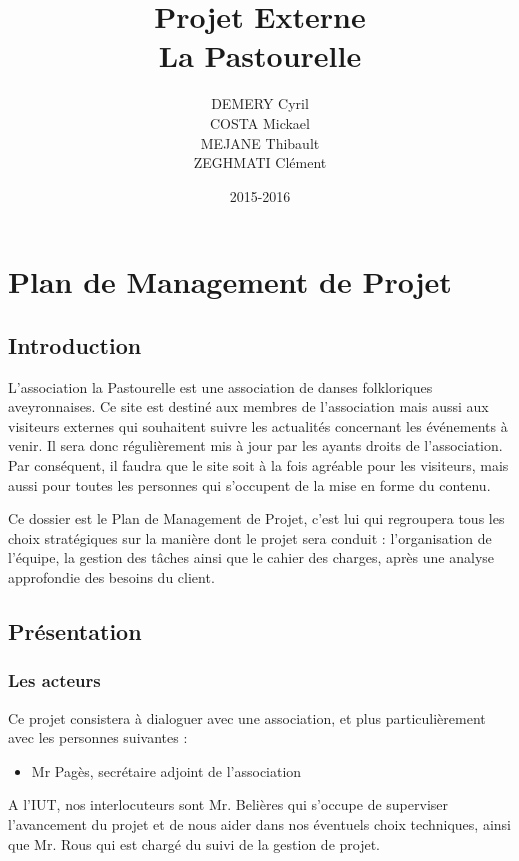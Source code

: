 \documentclass[11pt]{report}
\title{Projet Externe\\La Pastourelle}
\author{DEMERY Cyril\\COSTA Mickael\\MEJANE Thibault\\ZEGHMATI Clément}
\date{2015-2016}
\begin{document}
\maketitle
\setcounter{tocdepth}{5}
\tableofcontents
\chapter{Plan de Management de Projet}
\section{Introduction}
L’association la Pastourelle est une association de danses folkloriques 
aveyronnaises. Ce site est destiné aux membres de l’association mais aussi aux 
visiteurs externes qui souhaitent suivre les actualités concernant les 
événements à venir. Il sera donc régulièrement mis à jour par les ayants 
droits de l’association. Par conséquent, il faudra que le site soit à la fois 
agréable pour les visiteurs, mais aussi pour toutes les personnes qui 
s'occupent de la mise en forme du contenu.\\

\par Ce dossier est le Plan de Management de Projet, c'est lui qui regroupera 
tous les choix stratégiques sur la manière dont le projet sera conduit : 
l'organisation de l'équipe, la gestion des tâches ainsi que le cahier des 
charges, après une analyse approfondie des besoins du client.

\section{Présentation}
\subsection{Les acteurs}
Ce projet consistera à dialoguer avec une association, et plus particulièrement 
avec les personnes suivantes : 
\begin{itemize}
    \item Mr Pagès, secrétaire adjoint de l’association\\
\end{itemize}

\par A l'IUT, nos interlocuteurs sont Mr. Belières qui s'occupe de superviser 
l'avancement du projet et de nous aider dans nos éventuels choix techniques, 
ainsi que Mr. Rous qui est chargé du suivi de la gestion de projet.   \\
\end{document}
